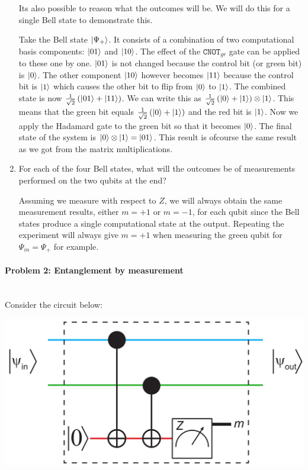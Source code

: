 \documentclass[12pt]{article}
\newcommand{\rsqrt}[1]{\ensuremath{\frac{1}{\sqrt{#1}}}}
\newenvironment{answer}{\begingroup\setlength{\leftskip}{-\leftmargin}\begin{framed}}{\end{framed}\endgroup}
\newcommand{\CNOT}[1]{\ensuremath{\texttt{CNOT}_{#1}}}
\begin{document}
\begin{enumerate}
\begin{answer}
        Its also possible to reason what the outcomes will be. We will do this for a single Bell state to demonstrate this.

        Take the Bell state $\ket{\Psi_+}$. It consists of a combination of two computational basis components: $\ket{01}$ and $\ket{10}$. The effect of the \CNOT{gr} gate can be applied to these one by one. $\ket{01}$ is not changed because the control bit (or green bit) is $\ket{0}$. The other component $\ket{10}$ however becomes $\ket{11}$ because the control bit is $\ket{1}$ which causes the other bit to flip from $\ket{0}$ to $\ket{1}$. The combined state is now $\rsqrt{2}\left(\ket{01} + \ket{11}\right)$. We can write this as $\rsqrt{2}\left(\ket{0} + \ket{1}\right) \otimes \ket{1}$. This means that the green bit equals $\rsqrt{2}\left(\ket{0} + \ket{1}\right)$ and the red bit is $\ket{1}$. Now we apply the Hadamard gate to the green bit so that it becomes $\ket{0}$. The final state of the system is $\ket{0} \otimes \ket{1} = \ket{01}$. This result is ofcourse the same result as we got from the matrix multiplications.
    \end{answer}

    \item For each of the four Bell states, what will the outcomes be of measurements performed on the two qubits at the end?

    \begin{answer}
        Assuming we measure with respect to $Z$, we will always obtain the same measurement results, either $m = +1$ or $m = -1$, for each qubit since the Bell states produce a single computational state at the output. Repeating the experiment will always give $m = +1$ when measuring the green qubit for $\Psi_{in} = \Psi_+$ for example.
    \end{answer}

\end{enumerate}

\paragraph{Problem 2: Entanglement by measurement} \hfill \\

Consider the circuit below:

\begin{center}\includegraphics[width=.4\textwidth]{problem-2.png}\end{center}
\end{document}
